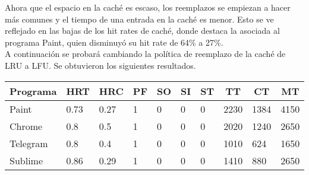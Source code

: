 \documentclass{article}
\begin{document}
Ahora que el espacio en la caché es escaso, los reemplazos se empiezan a hacer más comunes y el tiempo de una entrada en la caché es menor. Esto se ve reflejado en las bajas de los hit rates de caché, donde destaca la asociada al programa Paint, quien disminuyó su hit rate de 64\% a 27\%.\\

A continuación se probará cambiando la política de reemplazo de la caché de LRU a LFU. Se obtuvieron los siguientes resultados.


\begin{table}[H]
\begin{tabular}{|l|l|l|l|l|l|l|l|l|l|}
\hline
\multicolumn{1}{|c|}{\textbf{Programa}} & \multicolumn{1}{c|}{\textbf{HRT}} & \multicolumn{1}{c|}{\textbf{HRC}} & \multicolumn{1}{c|}{\textbf{PF}} & \multicolumn{1}{c|}{\textbf{SO}} & \multicolumn{1}{c|}{\textbf{SI}} & \multicolumn{1}{c|}{\textbf{ST}} & \multicolumn{1}{c|}{\textbf{TT}} & \multicolumn{1}{c|}{\textbf{CT}} & \multicolumn{1}{c|}{\textbf{MT}} \\ \hline
Paint                                   & 0.73                              & 0.27                              & 1                                & 0                                & 0                                & 0                                & 2230                             & 1384                             & 4150                             \\ \hline
Chrome                                  & 0.8                               & 0.5                               & 1                                & 0                                & 0                                & 0                                & 2020                             & 1240                             & 2650                             \\ \hline
Telegram                                & 0.8                               & 0.4                               & 1                                & 0                                & 0                                & 0                                & 1010                             & 624                              & 1650                             \\ \hline
Sublime                                 & 0.86                              & 0.29                              & 1                                & 0                                & 0                                & 0                                & 1410                             & 880                              & 2650                             \\ \hline
\end{tabular}
\end{table}
\end{document}

